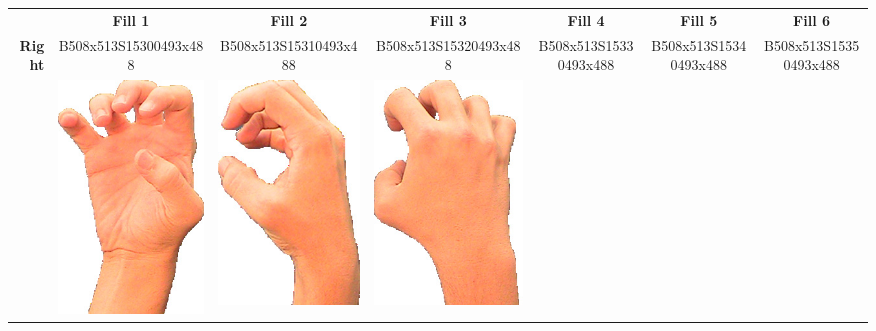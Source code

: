 \documentclass{article}
\begin{document}
\begin{center}
\begin{tabular}{r*{6}{c}}
&\textbf{Fill 1}&\textbf{Fill 2}&\textbf{Fill 3}&\textbf{Fill 4}&\textbf{Fill 5}&\textbf{Fill 6}\\
\multirow{2}{*}{\textbf{Right}}&
B508x513S15300493x488&
B508x513S15310493x488&
B508x513S15320493x488&
B508x513S15330493x488&
B508x513S15340493x488&
B508x513S15350493x488\\
&
\includegraphics[scale=0.1]{images/05-07-1.jpg}&
\includegraphics[scale=0.1]{images/05-07-2.jpg}&
\includegraphics[scale=0.1]{images/05-07-3.jpg}&

\end{tabular}
\end{center}
\end{document}
